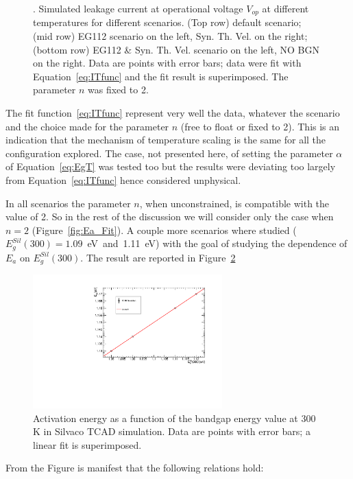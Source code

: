 \begin{figure}[!htbp]
\caption{\label{fig:Ea_Fit_fixn}. Simulated leakage current at operational voltage $V_{op}$ at different 
temperatures for different scenarios. (Top row) default scenario; (mid row) EG112 scenario on the left,  Syn. Th. Vel. on the right;  (bottom row)  EG112 \&  Syn. Th. Vel. scenario on the left, NO BGN 
on the right. Data are points with error bars; data were fit with Equation~\ref{eq:ITfunc}  and the fit result is superimposed. The parameter $n$  was fixed to 2.}
\end{figure}

The fit function~\ref{eq:ITfunc} represent very well the data, whatever the scenario and the choice 
made for the parameter $n$ (free to float or fixed to 2). This is an indication that the  
mechanism of temperature scaling is the same for all the configuration explored. The case, 
not presented here, of setting the parameter $\alpha$ of Equation~\ref{eq:EgT} was tested too 
but the results were deviating too largely from Equation~\ref{eq:ITfunc} hence considered 
unphysical. 

In all scenarios the parameter $n$, when unconstrained, is compatible with the value of 2. So 
in the rest of the discussion we will consider only the case when $n=2$ (Figure~\ref{fig:Ea_Fit}).
A couple more scenarios where studied ($E^{Sil}_g(300)=1.09$~eV~and~1.11~eV) with the 
goal of studying the dependence of $E_a$ on $E^{Sil}_g(300)$. The result are reported in 
Figure~\ref{fig:Ea_vs_Eg}

\begin{figure}[!htbp]
\centering
\includegraphics[width=0.65\textwidth]{Ea_vs_Eg.pdf}
\caption{\label{fig:Ea_vs_Eg}Activation energy as a function of the bandgap energy value at 300 K 
in Silvaco TCAD simulation. Data are points with error bars; a linear fit is superimposed.}
\end{figure}
From the Figure is manifest that the following relations hold:

